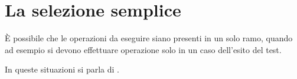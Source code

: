 \documentclass[
    notheorems,
    11pt,
    compress,
    aspectratio=169
]{beamer}
\begin{document}


\section{La selezione semplice}

\begin{frame}

    È possibile che le operazioni da eseguire siano presenti in un solo ramo, quando ad esempio si devono effettuare operazione solo in un caso dell’esito del test.

    \vspace{\baselineskip}

    In queste situazioni si parla di .
\end{frame}
\end{document}
